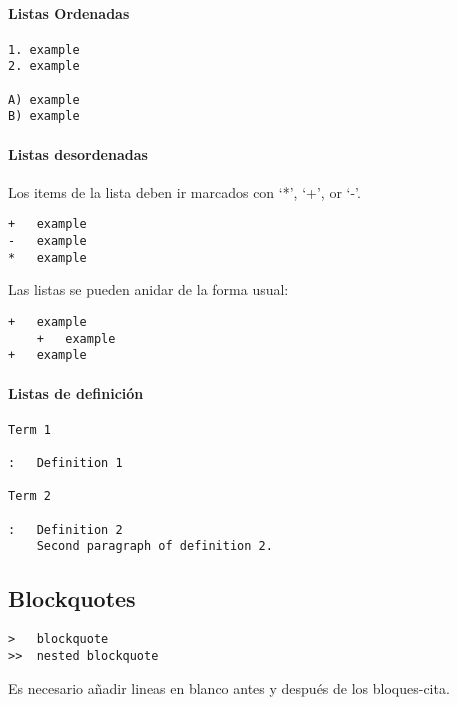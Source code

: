 \documentclass[
  12pt,
  spanish,
]{article}
\begin{document}
\hypertarget{listas-ordenadas}{%
\paragraph{Listas Ordenadas}\label{listas-ordenadas}}

\begin{verbatim}
1. example
2. example

A) example
B) example
\end{verbatim}

\hypertarget{listas-desordenadas}{%
\paragraph{Listas desordenadas}\label{listas-desordenadas}}

Los items de la lista deben ir marcados con `*', `+', or `-'.

\begin{verbatim}
+   example
-   example
*   example
\end{verbatim}

Las listas se pueden anidar de la forma usual:

\begin{verbatim}
+   example
    +   example
+   example
\end{verbatim}

\hypertarget{listas-de-definiciuxf3n}{%
\paragraph{Listas de definición}\label{listas-de-definiciuxf3n}}

\begin{verbatim}
Term 1

:   Definition 1

Term 2

:   Definition 2
    Second paragraph of definition 2.
\end{verbatim}

\hypertarget{blockquotes}{%
\subsection{Blockquotes}\label{blockquotes}}

\begin{verbatim}
>   blockquote
>>  nested blockquote
\end{verbatim}

Es necesario añadir lineas en blanco antes y después de los
bloques-cita.
\end{document}
